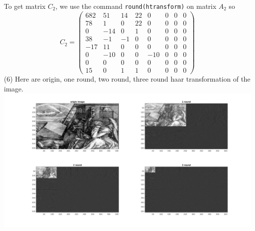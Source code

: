 \documentclass[12pt]{article}
\begin{document}
To get matrix $C_2$, we use the command {\tt round(htransform)} on matrix $A_2$ so $$C_2 = \begin{pmatrix}
682 &   51  &   14   &  22  &    0  &    0 &     0 &     0\\
    78  &    1   &   0  &   22   &   0  &    0 &     0  &    0\\
     0  &  -14    &  0  &    1 &     0 &     0  &    0  &    0\\
    38  &   -1  &   -1 &     0  &    0  &    0  &    0  &    0\\
   -17  &   11  &    0   &   0  &    0   &   0  &    0  &    0\\
     0  &  -10  &    0  &    0 &   -10 &     0   &   0  &    0\\
     0    &  0  &    0   &   0  &    0  &    0 &     0 &     0\\
    15    &  0  &    1  &    1  &    0  &    0  &    0  &    0
\end{pmatrix}$$
(6)
Here are origin, one round, two round, three round haar transformation of the image. \\
\includegraphics[scale=0.25] {Problem6_origin_vs_1_2_3_round_haar}
\end{document}
